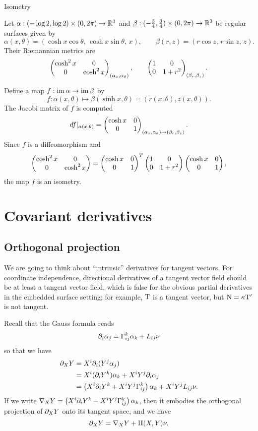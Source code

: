 \documentclass{../note}
\def\a{\alpha}
\def\II{\mathrm{II}}
\begin{document}
Isometry
\begin{ex}
Let $\a:(-\log2,\log2)\times(0,2\pi)\to\R^3$ and $\beta:(-\frac34,\frac34)\times(0,2\pi)\to\mathbb{R}^3$ be regular surfaces given by
\[\a(x,\theta)=(\cosh x\cos\theta,\,\cosh x\sin\theta,\,x),\qquad
\beta(r,z)=(r\cos z,\,r\sin z,\,z).\]
Their Riemannian metrics are
\[\mat{\cosh^2x&0\\0&\cosh^2x}_{(\a_x,\a_\theta)},\qquad\mat{1&0\\0&1+r^2}_{(\beta_r,\beta_z)}.\]

Define a map $f:\im\a\to\im\beta$ by
\[f:\a(x,\theta)\mapsto\beta(\sinh x,\theta)=(r(x,\theta),z(x,\theta)).\]
The Jacobi matrix of $f$ is computed
\[df|_{\a(x,\theta)}=\mat{\cosh x&0\\0&1}_{(\a_x,\a_\theta)\to(\beta_r,\beta_z)}.\]
Since $f$ is a diffeomorphism and
\[\begin{pmatrix}\cosh^2x&0\\0&\cosh^2x\end{pmatrix}=\begin{pmatrix}\cosh x&0\\0&1\end{pmatrix}^T\begin{pmatrix}1&0\\0&1+r^2\end{pmatrix}\begin{pmatrix}\cosh x&0\\0&1\end{pmatrix},\]
the map $f$ is an isometry.
\end{ex}




\chapter{Covariant derivatives}

\section{Orthogonal projection}
We are going to think about ``intrinsic'' derivatives for tangent vectors.
For coordinate independence, directional derivatives of a tangent vector field should be at least a tangent vector field, which is false for the obvious partial derivatives in the embedded surface setting; for example, $\mathrm{T}$ is a tangent vector, but $\mathrm{N}=\kappa\mathrm{T}'$ is not tangent.

Recall that the Gauss formula reads
\[\pd_i\a_j=\Gamma_{ij}^k\a_k+L_{ij}\nu\]
so that we have
\begin{align*}
\pd_XY
&=X^i\pd_i(Y^j\a_j)\\
&=X^i(\pd_iY^k)\a_k+X^iY^j\pd_i\a_j\\
&=\left(X^i\pd_iY^k+X^iY^j\Gamma_{ij}^k\right)\a_k+X^iY^jL_{ij}\nu.
\end{align*}
If we write $\nabla_XY=\left(X^i\pd_iY^k+X^iY^j\Gamma_{ij}^k\right)\a_k$, then it embodies the orthogonal projection of $\pd_XY$ onto its tangent space, and we have
\[\pd_XY=\nabla_XY+\II(X,Y)\nu.\]
\end{document}
